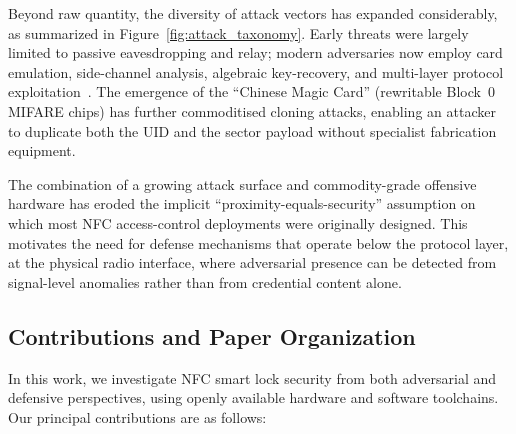 \documentclass[sigconf]{acmart}
\begin{document}
\begin{center}
\label{fig:attack_taxonomy}
\end{center}

Beyond raw quantity, the diversity of attack vectors has expanded considerably, as summarized in Figure~\ref{fig:attack_taxonomy}. Early threats were largely limited to passive eavesdropping and relay; modern adversaries now employ card emulation, side-channel analysis, algebraic key-recovery, and multi-layer protocol exploitation~\cite{kasper2012all}. The emergence of the ``Chinese Magic Card'' (rewritable Block~0 MIFARE chips) has further commoditised cloning attacks, enabling an attacker to duplicate both the UID and the sector payload without specialist fabrication equipment.

The combination of a growing attack surface and commodity-grade offensive hardware has eroded the implicit ``proximity-equals-security'' assumption on which most NFC access-control deployments were originally designed. This motivates the need for defense mechanisms that operate below the protocol layer, at the physical radio interface, where adversarial presence can be detected from signal-level anomalies rather than from credential content alone.

\subsection{Contributions and Paper Organization}

In this work, we investigate NFC smart lock security from both adversarial and defensive perspectives, using openly available hardware and software toolchains. Our principal contributions are as follows:
\end{document}
